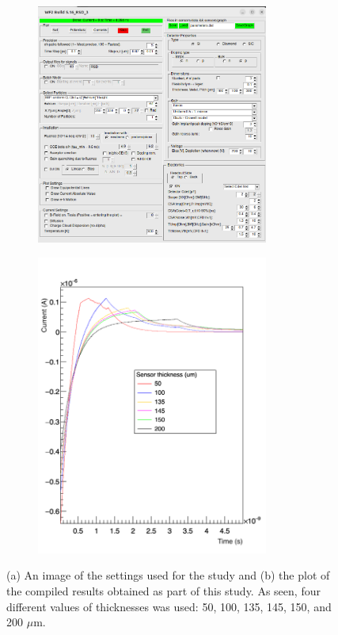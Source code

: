 \documentclass[11pt]{article}
\begin{document}
\begin{figure}[h!]
    \centering
    \begin{subfigure}[t]{0.49\textwidth}
        \centering
        \includegraphics[width=3in]{Images/thickness_other_settings.png}
        \caption{}
        \label{fig:thickness_other_settings}
    \end{subfigure}%
    \begin{subfigure}[t]{0.49\textwidth}
        \centering
        \includegraphics[width=3in]{Images/thickness_plot.png}
        \caption{}
        \label{fig:thickness_plot}
    \end{subfigure}
    \caption{(a) An image of the settings used for the study and (b) the plot of the compiled results obtained as part of this study. As seen, four different values of thicknesses was used: 50, 100, 135, 145, 150, and 200 $\mu$m.}
\end{figure}
\end{document}
